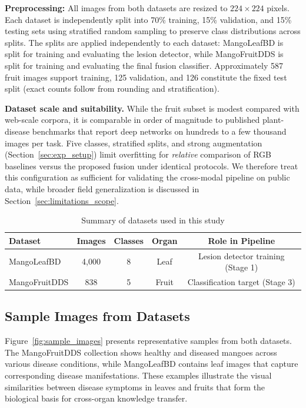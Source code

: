\documentclass[utf8]{FrontiersinHarvard} %
\begin{document}
\textbf{Preprocessing:} All images from both datasets are resized to $224 \times 224$ pixels. Each dataset is independently split into 70\% training, 15\% validation, and 15\% testing sets using stratified random sampling to preserve class distributions across splits. The splits are applied independently to each dataset: MangoLeafBD is split for training and evaluating the lesion detector, while MangoFruitDDS is split for training and evaluating the final fusion classifier. Approximately 587 fruit images support training, 125 validation, and 126 constitute the fixed test split (exact counts follow from rounding and stratification).

\textbf{Dataset scale and suitability.} While the fruit subset is modest compared with web-scale corpora, it is comparable in order of magnitude to published plant-disease benchmarks that report deep networks on hundreds to a few thousand images per task. Five classes, stratified splits, and strong augmentation (Section~\ref{sec:exp_setup}) limit overfitting for \emph{relative} comparison of RGB baselines versus the proposed fusion under identical protocols. We therefore treat this configuration as sufficient for validating the cross-modal pipeline on public data, while broader field generalization is discussed in Section~\ref{sec:limitations_scope}.

\begin{table}[h!]
    \centering
    \caption{Summary of datasets used in this study}
    \label{tab:datasets}
    \footnotesize
    \begin{tabular}{lcccc}
        \toprule
        \textbf{Dataset} & \textbf{Images} & \textbf{Classes} & \textbf{Organ} & \textbf{Role in Pipeline} \\
        \midrule
        MangoLeafBD & 4,000 & 8 & Leaf & Lesion detector training (Stage 1) \\
        MangoFruitDDS & 838 & 5 & Fruit & Classification target (Stage 3) \\
        \bottomrule
    \end{tabular}
\end{table}

\subsection{Sample Images from Datasets}
Figure~\ref{fig:sample_images} presents representative samples from both datasets. The MangoFruitDDS collection shows healthy and diseased mangoes across various disease conditions, while MangoLeafBD contains leaf images that capture corresponding disease manifestations. These examples illustrate the visual similarities between disease symptoms in leaves and fruits that form the biological basis for cross-organ knowledge transfer.
\end{document}
